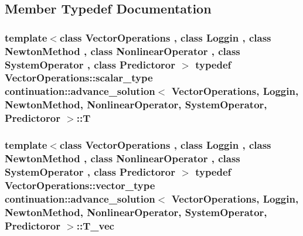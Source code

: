 \subsection{Member Typedef Documentation}
\hypertarget{classcontinuation_1_1advance__solution_a525792bcc16846c5ba10f15400d53fed}{
\subsubsection[{T}]{\setlength{\rightskip}{0pt plus 5cm}template$<$class Vector\-Operations , class Loggin , class Newton\-Method , class Nonlinear\-Operator , class System\-Operator , class Predictoror $>$ typedef Vector\-Operations\-::scalar\-\_\-type {\bf continuation\-::advance\-\_\-solution}$<$ Vector\-Operations, Loggin, Newton\-Method, Nonlinear\-Operator, System\-Operator, Predictoror $>$\-::{\bf T}}}\label{classcontinuation_1_1advance__solution_a525792bcc16846c5ba10f15400d53fed}
\hypertarget{classcontinuation_1_1advance__solution_a2c54f76f6415c6d28af4c97f7d6fe605}{
\subsubsection[{T\-\_\-vec}]{\setlength{\rightskip}{0pt plus 5cm}template$<$class Vector\-Operations , class Loggin , class Newton\-Method , class Nonlinear\-Operator , class System\-Operator , class Predictoror $>$ typedef Vector\-Operations\-::vector\-\_\-type {\bf continuation\-::advance\-\_\-solution}$<$ Vector\-Operations, Loggin, Newton\-Method, Nonlinear\-Operator, System\-Operator, Predictoror $>$\-::{\bf T\-\_\-vec}}}\label{classcontinuation_1_1advance__solution_a2c54f76f6415c6d28af4c97f7d6fe605}


